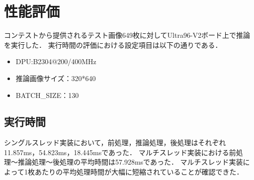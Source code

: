 \section{性能評価}
コンテストから提供されるテスト画像649枚に対してUltra96-V2ボード上で推論を実行した．
実行時間の評価における設定項目は以下の通りである．
\begin{itemize}
    \item{DPU:B2304@200/400MHz}
    \item{推論画像サイズ：320*640}
    \item{BATCH\_SIZE：130}
\end{itemize}
\subsection{実行時間}
シングルスレッド実装において，前処理，推論処理，後処理はそれぞれ11.857ms，54.823ms，18.445msであった．
マルチスレッド実装における前処理〜推論処理〜後処理の平均時間は57.928msであった．
マルチスレッド実装によって1枚あたりの平均処理時間が大幅に短縮されていることが確認できた．

